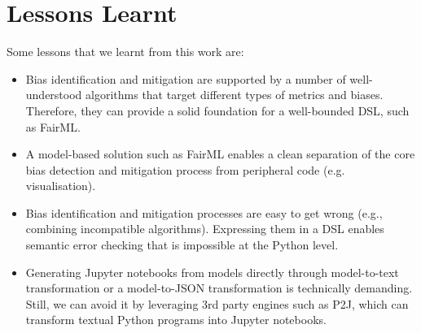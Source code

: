 \documentclass[sigconf,review]{acmart}
\begin{document}
{\section{Lessons Learnt}
\label{sec:lessons_learned}
Some lessons that we learnt from this work are:
\begin{itemize}[leftmargin=*]
	\item Bias identification and mitigation are supported by a number of well-understood algorithms that target different types of metrics and biases. Therefore, they can provide a solid foundation for a well-bounded DSL, such as FairML.
	\item A model-based solution such as FairML enables a clean separation of the core bias detection and mitigation process from peripheral code (e.g. visualisation).
	\item  Bias identification and mitigation processes are easy to get wrong (e.g., combining incompatible algorithms). Expressing them in a DSL enables semantic error checking that is impossible at the Python level. 
	\item Generating Jupyter notebooks from models directly through model-to-text transformation or a model-to-JSON transformation is technically demanding. Still, we can avoid it by leveraging 3rd party engines such as P2J, which can transform textual Python programs into Jupyter notebooks.
\end{itemize}
%	
	
}
\end{document}
